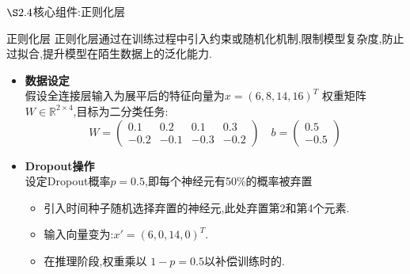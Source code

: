 \documentclass{beamer}
\begin{document}
\begin{frame}{$\S2.4$核心组件:正则化层}
    \begin{block}{正则化层}
        正则化层通过在训练过程中引入约束或随机化机制,限制模型复杂度,防止过拟合,提升模型在陌生数据上的泛化能力.
    \end{block}
    \begin{itemize}
        \item \textbf{数据设定} \\
        假设全连接层输入为展平后的特征向量为$x=(6,8,14,16)^T$
        权重矩阵$W\in\mathbb{R}^{2\times4} $,目标为二分类任务:
        \[
            W=\begin{pmatrix}
                0.1&0.2&0.1&0.3\\
                -0.2&-0.1&-0.3&-0.2
            \end{pmatrix}
            \quad b=
            \begin{pmatrix}
                0.5\\
                -0.5
            \end{pmatrix}
        \]
        \item \textbf{Dropout操作}
        \\设定Dropout概率$p=0.5$,即每个神经元有50\%的概率被弃置
        \begin{itemize}
            \item 引入时间种子随机选择弃置的神经元,此处弃置第2和第4个元素.
            \item 输入向量变为:$x'=(6,0,14,0)^T $.
            \item 在推理阶段,权重乘以 $1-p=0.5$以补偿训练时的.
        \end{itemize}
    \end{itemize}
\end{frame}
\end{document}
